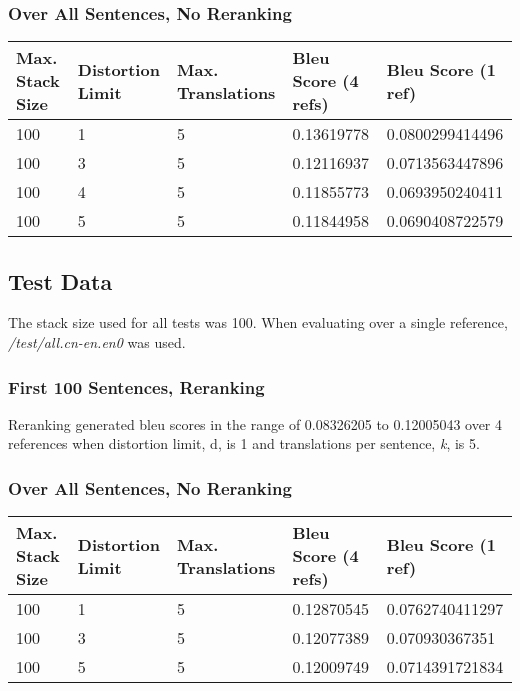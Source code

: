 \documentclass[letterpaper]{article}
\begin{document}
\subsubsection{Over All Sentences, No Reranking}
\begin{center}
  \begin{tabularx}{0.95\textwidth}{| X | X | X | X | X |}
  \hline
  Max. Stack Size & Distortion Limit & Max. Translations & Bleu Score (4 refs) & Bleu Score (1 ref) \\
  \hline
  100 & 1 & 5 & 0.13619778 & 0.0800299414496\\
  \hline
  100 & 3 & 5 & 0.12116937 & 0.0713563447896\\
  \hline
  100 & 4 & 5 & 0.11855773 & 0.0693950240411\\
  \hline
  100 & 5 & 5 & 0.11844958 & 0.0690408722579\\
  \hline
  \end{tabularx}
\end{center}

\subsection{Test Data}

The stack size used for all tests was 100. When evaluating over a single reference, \textit{/test/all.cn-en.en0} was used.

\subsubsection{First 100 Sentences, Reranking}

Reranking generated bleu scores in the range of 0.08326205 to 0.12005043 over 4 references when distortion limit, d, is 1 and translations per sentence, \textit{k}, is 5.

\subsubsection{Over All Sentences, No Reranking}

\begin{center}
  \begin{tabularx}{0.95\textwidth}{| X | X | X | X | X |}
  \hline
  Max. Stack Size & Distortion Limit & Max. Translations & Bleu Score (4 refs) & Bleu Score (1 ref) \\
  \hline
  100 & 1 & 5 & 0.12870545 & 0.0762740411297\\
  \hline
  100 & 3 & 5 & 0.12077389 & 0.070930367351\\
  \hline
  100 & 5 & 5 & 0.12009749 & 0.0714391721834\\
  \hline
  \end{tabularx}
\end{center}
\end{document}
